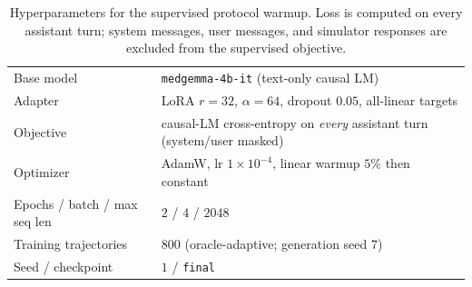 \documentclass{article}
\begin{document}
\begin{table}[ht]
\centering
\caption{Hyperparameters for the supervised protocol warmup. Loss is computed
on every assistant turn; system messages, user messages, and simulator responses
are excluded from the supervised objective.}
\label{tab:sfthp}
\begin{tabular}{ll}
\toprule
Base model & \texttt{medgemma-4b-it} (text-only causal LM) \\
Adapter & LoRA $r{=}32$, $\alpha{=}64$, dropout $0.05$, all-linear targets \\
Objective & causal-LM cross-entropy on \emph{every} assistant turn (system/user masked) \\
Optimizer & AdamW, lr $1{\times}10^{-4}$, linear warmup $5\%$ then constant \\
Epochs / batch / max seq len & $2$ / $4$ / $2048$ \\
Training trajectories & $800$ (oracle-adaptive; generation seed $7$) \\
Seed / checkpoint & $1$ / \texttt{final} \\
\bottomrule
\end{tabular}
\end{table}
\end{document}
